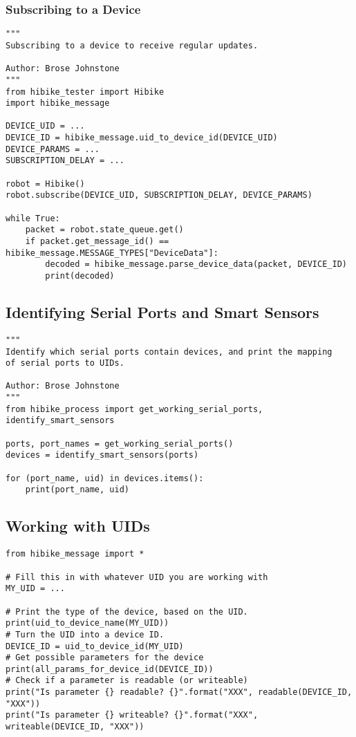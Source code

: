 \documentclass[12pt]{book}
\begin{document}
\subsubsection{Subscribing to a Device}
\begin{verbatim}
"""
Subscribing to a device to receive regular updates.

Author: Brose Johnstone
"""
from hibike_tester import Hibike
import hibike_message

DEVICE_UID = ...
DEVICE_ID = hibike_message.uid_to_device_id(DEVICE_UID)
DEVICE_PARAMS = ...
SUBSCRIPTION_DELAY = ...

robot = Hibike()
robot.subscribe(DEVICE_UID, SUBSCRIPTION_DELAY, DEVICE_PARAMS)

while True:
    packet = robot.state_queue.get()
    if packet.get_message_id() == hibike_message.MESSAGE_TYPES["DeviceData"]:
        decoded = hibike_message.parse_device_data(packet, DEVICE_ID)
        print(decoded)
\end{verbatim}

\subsection{Identifying Serial Ports and Smart Sensors}
\begin{verbatim}
"""
Identify which serial ports contain devices, and print the mapping
of serial ports to UIDs.

Author: Brose Johnstone
"""
from hibike_process import get_working_serial_ports, identify_smart_sensors

ports, port_names = get_working_serial_ports()
devices = identify_smart_sensors(ports)

for (port_name, uid) in devices.items():
    print(port_name, uid)
\end{verbatim}

\subsection{Working with UIDs}
\begin{verbatim}
from hibike_message import *

# Fill this in with whatever UID you are working with
MY_UID = ...

# Print the type of the device, based on the UID.
print(uid_to_device_name(MY_UID))
# Turn the UID into a device ID.
DEVICE_ID = uid_to_device_id(MY_UID)
# Get possible parameters for the device
print(all_params_for_device_id(DEVICE_ID))
# Check if a parameter is readable (or writeable)
print("Is parameter {} readable? {}".format("XXX", readable(DEVICE_ID, "XXX"))
print("Is parameter {} writeable? {}".format("XXX", writeable(DEVICE_ID, "XXX"))
\end{verbatim}
\end{document}
